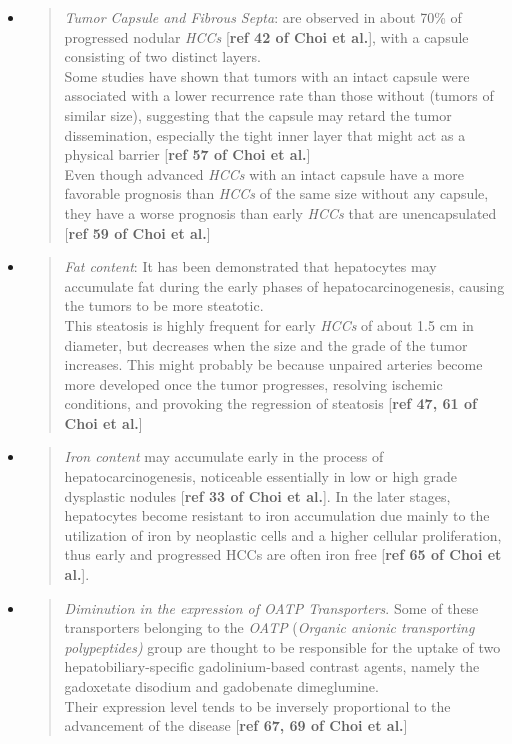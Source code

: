 \documentclass[]{article}
\begin{document}
\begin{itemize}
\item
  \begin{quote}
  \emph{Tumor Capsule and Fibrous Septa}: are observed in about 70\% of
  progressed nodular \emph{HCCs} {[}\textbf{ref 42 of Choi et al.}{]},
  with a capsule consisting of two distinct layers.\\
  Some studies have shown that tumors with an intact capsule were
  associated with a lower recurrence rate than those without (tumors of
  similar size), suggesting that the capsule may retard the tumor
  dissemination, especially the tight inner layer that might act as a
  physical barrier {[}\textbf{ref 57 of Choi et al.}{]}\\
  Even though advanced \emph{HCCs} with an intact capsule have a more
  favorable prognosis than \emph{HCCs} of the same size without any
  capsule, they have a worse prognosis than early \emph{HCCs} that are
  unencapsulated {[}\textbf{ref 59 of Choi et al.}{]}
  \end{quote}
\item
  \begin{quote}
  \emph{Fat content}: It has been demonstrated that hepatocytes may
  accumulate fat during the early phases of hepatocarcinogenesis,
  causing the tumors to be more steatotic.\\
  This steatosis is highly frequent for early \emph{HCCs} of about 1.5
  cm in diameter, but decreases when the size and the grade of the tumor
  increases. This might probably be because unpaired arteries become
  more developed once the tumor progresses, resolving ischemic
  conditions, and provoking the regression of steatosis {[}\textbf{ref
  47, 61 of Choi et al.}{]}
  \end{quote}
\item
  \begin{quote}
  \emph{Iron content} may accumulate early in the process of
  hepatocarcinogenesis, noticeable essentially in low or high grade
  dysplastic nodules {[}\textbf{ref 33 of Choi et al.}{]}. In the later
  stages, hepatocytes become resistant to iron accumulation due mainly
  to the utilization of iron by neoplastic cells and a higher cellular
  proliferation, thus early and progressed HCCs are often iron free
  {[}\textbf{ref 65 of Choi et al.}{]}.
  \end{quote}
\item
  \begin{quote}
  \emph{Diminution in the expression of OATP Transporters}. Some of
  these transporters belonging to the \emph{OATP} (\emph{Organic anionic
  transporting polypeptides)} group are thought to be responsible for
  the uptake of two hepatobiliary-specific gadolinium-based contrast
  agents, namely the gadoxetate disodium and gadobenate dimeglumine.\\
  Their expression level tends to be inversely proportional to the
  advancement of the disease {[}\textbf{ref 67, 69 of Choi et al.}{]}
  \end{quote}
\end{itemize}
\end{document}
